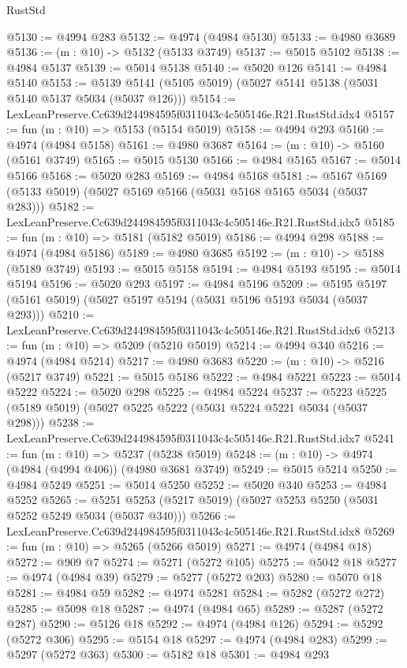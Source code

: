 \begin{lexlean}{RustStd}
\begin{coremodule}
@5130 := @4994 @283
@5132 := @4974 (@4984 @5130)
@5133 := @4980 @3689
@5136 := (m : @10) -> @5132 (@5133 @3749)
@5137 := @5015 @5102
@5138 := @4984 @5137
@5139 := @5014 @5138
@5140 := @5020 @126
@5141 := @4984 @5140
@5153 := @5139 @5141 (@5105 @5019) (@5027 @5141 @5138 (@5031 @5140 @5137 @5034 (@5037 @126)))
@5154 := LexLeanPreserve.Cc639d244984595f0311043c4c505146e.R21.RustStd.idx4
@5157 := fun (m : @10) => @5153 (@5154 @5019)
@5158 := @4994 @293
@5160 := @4974 (@4984 @5158)
@5161 := @4980 @3687
@5164 := (m : @10) -> @5160 (@5161 @3749)
@5165 := @5015 @5130
@5166 := @4984 @5165
@5167 := @5014 @5166
@5168 := @5020 @283
@5169 := @4984 @5168
@5181 := @5167 @5169 (@5133 @5019) (@5027 @5169 @5166 (@5031 @5168 @5165 @5034 (@5037 @283)))
@5182 := LexLeanPreserve.Cc639d244984595f0311043c4c505146e.R21.RustStd.idx5
@5185 := fun (m : @10) => @5181 (@5182 @5019)
@5186 := @4994 @298
@5188 := @4974 (@4984 @5186)
@5189 := @4980 @3685
@5192 := (m : @10) -> @5188 (@5189 @3749)
@5193 := @5015 @5158
@5194 := @4984 @5193
@5195 := @5014 @5194
@5196 := @5020 @293
@5197 := @4984 @5196
@5209 := @5195 @5197 (@5161 @5019) (@5027 @5197 @5194 (@5031 @5196 @5193 @5034 (@5037 @293)))
@5210 := LexLeanPreserve.Cc639d244984595f0311043c4c505146e.R21.RustStd.idx6
@5213 := fun (m : @10) => @5209 (@5210 @5019)
@5214 := @4994 @340
@5216 := @4974 (@4984 @5214)
@5217 := @4980 @3683
@5220 := (m : @10) -> @5216 (@5217 @3749)
@5221 := @5015 @5186
@5222 := @4984 @5221
@5223 := @5014 @5222
@5224 := @5020 @298
@5225 := @4984 @5224
@5237 := @5223 @5225 (@5189 @5019) (@5027 @5225 @5222 (@5031 @5224 @5221 @5034 (@5037 @298)))
@5238 := LexLeanPreserve.Cc639d244984595f0311043c4c505146e.R21.RustStd.idx7
@5241 := fun (m : @10) => @5237 (@5238 @5019)
@5248 := (m : @10) -> @4974 (@4984 (@4994 @406)) (@4980 @3681 @3749)
@5249 := @5015 @5214
@5250 := @4984 @5249
@5251 := @5014 @5250
@5252 := @5020 @340
@5253 := @4984 @5252
@5265 := @5251 @5253 (@5217 @5019) (@5027 @5253 @5250 (@5031 @5252 @5249 @5034 (@5037 @340)))
@5266 := LexLeanPreserve.Cc639d244984595f0311043c4c505146e.R21.RustStd.idx8
@5269 := fun (m : @10) => @5265 (@5266 @5019)
@5271 := @4974 (@4984 @18)
@5272 := @909 @7
@5274 := @5271 (@5272 @105)
@5275 := @5042 @18
@5277 := @4974 (@4984 @39)
@5279 := @5277 (@5272 @203)
@5280 := @5070 @18
@5281 := @4984 @59
@5282 := @4974 @5281
@5284 := @5282 (@5272 @272)
@5285 := @5098 @18
@5287 := @4974 (@4984 @65)
@5289 := @5287 (@5272 @287)
@5290 := @5126 @18
@5292 := @4974 (@4984 @126)
@5294 := @5292 (@5272 @306)
@5295 := @5154 @18
@5297 := @4974 (@4984 @283)
@5299 := @5297 (@5272 @363)
@5300 := @5182 @18
@5301 := @4984 @293

\end{coremodule}
\end{lexlean}
